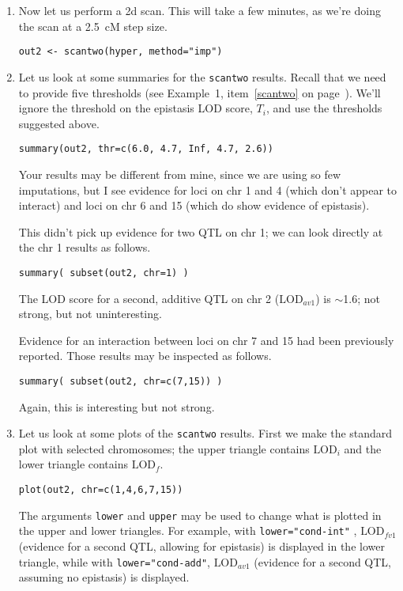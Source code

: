 \documentclass[10pt,letterpaper]{article}
\newcommand{\usercolor}{\color [named]{BlueViolet}}
\newcommand{\lod}{\text{LOD}}
\begin{document}
\begin{enumerate}
\item Now let us perform a 2d scan.  This will take a few minutes, as
  we're doing the scan at a 2.5~cM step size.

\usercolor \verb|out2 <- scantwo(hyper, method="imp")| \normalcolor

\item Let us look at some summaries for the \verb-scantwo- results.
  Recall that we need to provide five thresholds (see Example~1,
  item~\ref{scantwo} on page~\pageref{scantwo}).
  We'll ignore the threshold on the epistasis LOD score, $T_i$, and
  use the thresholds suggested above.

\usercolor \verb|summary(out2, thr=c(6.0, 4.7, Inf, 4.7, 2.6))|
\normalcolor

Your results may be different from mine, since we are using so few
imputations, but I see evidence for loci on chr 1 and 4 (which
don't appear to interact) and loci on chr 6 and 15 (which do
show evidence of epistasis).  

This didn't pick up evidence for two QTL on chr 1; we can look
directly at the chr 1 results as follows.

\usercolor \verb|summary( subset(out2, chr=1) )| \normalcolor

The LOD score for a second, additive QTL on chr 2
($\lod_{av1}$) is $\sim$1.6; not strong, but not uninteresting. 

Evidence for an interaction between loci on chr 7 and 15 had
been previously reported.  Those results may be inspected as follows.

\usercolor \verb|summary( subset(out2, chr=c(7,15)) )| \normalcolor

Again, this is interesting but not strong.

\item Let us look at some plots of the \verb-scantwo- results.  First
  we make the standard plot with selected chromosomes; the upper
  triangle contains $\lod_i$ and the lower triangle contains $\lod_f$.

\usercolor \verb|plot(out2, chr=c(1,4,6,7,15))| \normalcolor

The arguments \verb-lower- and \verb-upper- may be used to change what
is plotted in the upper and lower triangles.  For example, with
\verb:lower="cond-int": , $\lod_{fv1}$ (evidence for a second QTL,
allowing for epistasis) is displayed in the lower triangle, while with
\verb:lower="cond-add":, $\lod_{av1}$ (evidence for a second QTL,
assuming no epistasis) is displayed.


\end{enumerate}
\end{document}
